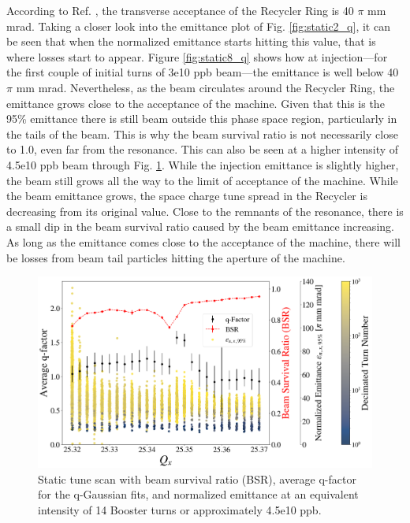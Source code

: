 According to Ref. \cite{rr0}, the transverse acceptance of the Recycler Ring is 40 $\pi$ mm mrad. Taking a closer look into the emittance plot of Fig. \ref{fig:static2_q}, it can be seen that when the normalized emittance starts hitting this value, that is where losses start to appear. Figure \ref{fig:static8_q} shows how at injection---for the first couple of initial turns of 3e10 ppb beam---the emittance is well below 40 $\pi$ mm mrad. Nevertheless, as the beam circulates around the Recycler Ring, the emittance grows close to the acceptance of the machine. Given that this is the 95\% emittance there is still beam outside this phase space region, particularly in the tails of the beam. This is why the beam survival ratio is not necessarily close to 1.0, even far from the resonance. This can also be seen at a higher intensity of 4.5e10 ppb beam through Fig. \ref{fig:static14_q}. While the injection emittance is slightly higher, the beam still grows all the way to the limit of acceptance of the machine. While the beam emittance grows, the space charge tune spread in the Recycler is decreasing from its original value. Close to the remnants of the resonance, there is a small dip in the beam survival ratio caused by the beam emittance increasing. As long as the emittance comes close to the acceptance of the machine, there will be losses from beam tail particles hitting the aperture of the machine. 

\begin{figure}[H]
    \centering
    \includegraphics[width=\columnwidth]{chapter6/static14turns_emittance_dampersOFF.png}
    \caption{Static tune scan with beam survival ratio (BSR), average q-factor for the q-Gaussian fits, and normalized emittance at an equivalent intensity of 14 Booster turns or approximately 4.5e10 ppb.}
    \label{fig:static14_q}
\end{figure}

